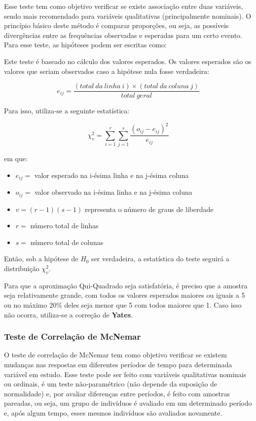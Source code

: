 \documentclass[
  portuguese,
]{estat/estat}
\providecommand{\tightlist}{%
  \setlength{\itemsep}{0pt}\setlength{\parskip}{0pt}}
\begin{document}
Esse teste tem como objetivo verificar se existe associação entre duas
variáveis, sendo mais recomendado para variáveis qualitativas
(principalmente nominais). O princípio básico deste método é comparar
proporções, ou seja, as possíveis divergências entre as frequências
observadas e esperadas para um certo evento. Para esse teste, as
hipóteses podem ser escritas como:


Este teste é baseado no cálculo dos valores esperados. Os valores
esperados são os valores que seriam observados caso a hipótese nula
fosse verdadeira:

\[e_{ij} = \frac{(total\ da\ linha\ i) \times (total\ da\ coluna\ j)}{total\ geral} \]

Para isso, utiliza-se a seguinte estatística:

\[\chi_{v}^{2} = \displaystyle\sum_{i=1}^r \sum_{j=1}^s \frac{ {(o_{ij} - e_{ij})}^2}{e_{ij}}\]

em que:

\begin{itemize}
\tightlist
\item
  \(e_{ij}=\) valor esperado na i-ésima linha e na j-ésima coluna
\item
  \(o_{ij}=\) valor observado na i-ésima linha e na j-ésima coluna
\item
  \(v = (r - 1)(s - 1)\) representa o número de graus de liberdade
\item
  \(r=\) número total de linhas
\item
  \(s=\) número total de colunas
\end{itemize}

Então, sob a hipótese de \(H_{0}\) ser verdadeira, a estatística do
teste seguirá a distribuição \(\chi_{v}^{2}\).

Para que a aproximação Qui-Quadrado seja satisfatória, é preciso que a
amostra seja relativamente grande, com todos os valores esperados
maiores ou iguais a 5 ou no máximo 20\% deles seja menor que 5 com todos
maiores que 1. Caso isso não ocorra, utiliza-se a correção de
\textbf{Yates}.

\subsubsection{Teste de Correlação de
McNemar}\label{teste-de-correlauxe7uxe3o-de-mcnemar}

O teste de correlação de McNemar tem como objetivo verificar se existem
mudanças nas respostas em diferentes períodos de tempo para determinada
variável em estudo. Esse teste pode ser feito com variáveis qualitativas
nominais ou ordinais, é um teste não-paramétrico (não depende da
suposição de normalidade) e, por avaliar diferenças entre períodos, é
feito com amostras pareadas, ou seja, um grupo de indivíduos é avaliado
em um determinado período e, após algum tempo, esses mesmos indivíduos
são avaliados novamente.
\end{document}
